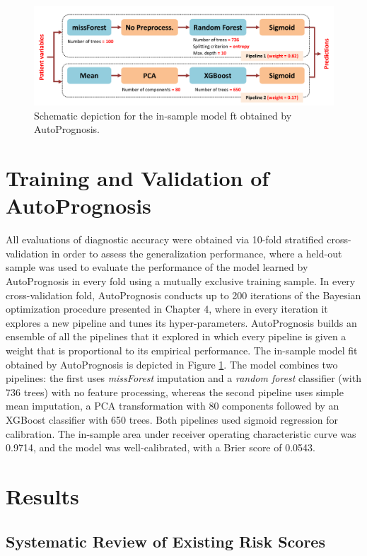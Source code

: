 \documentclass [PhD] {uclathes}
\begin{document}
\begin{figure}[t]
\centering
\includegraphics[width=5.5in]{ch6Fig2.pdf}
\caption{Schematic depiction for the in-sample model ft obtained by AutoPrognosis.}
\label{ch6fig2}
\end{figure}

\section{Training and Validation of AutoPrognosis}
\label{ch6sec2} 
All evaluations of diagnostic accuracy were obtained via 10-fold stratified cross-validation in order to assess the generalization performance, where a held-out sample was used to evaluate the performance of the model learned by AutoPrognosis in every fold using a mutually exclusive training sample. In every cross-validation fold, AutoPrognosis conducts up to 200 iterations of the Bayesian optimization procedure presented in Chapter 4, where in every iteration it explores a new pipeline and tunes its hyper-parameters. AutoPrognosis builds an ensemble of all the pipelines that it explored in which every pipeline is given a weight that is proportional to its empirical performance. The in-sample model fit obtained by AutoPrognosis is depicted in Figure \ref{ch6fig2}. The model combines two pipelines: the first uses {\it missForest} imputation\cite{stekhoven2011missforest} and a {\it random forest} classifier (with 736 trees) with no feature processing, whereas the second pipeline uses simple mean imputation, a PCA transformation with 80 components followed by an XGBoost classifier with 650 trees. Both pipelines used sigmoid regression for calibration. The in-sample area under receiver operating characteristic curve was 0.9714, and the model was well-calibrated, with a Brier score of 0.0543. 

\section{Results}
\label{ch6sec3}
\subsection{Systematic Review of Existing Risk Scores} 
\end{document}
